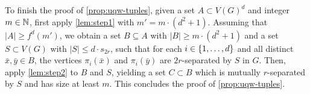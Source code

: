 \begin{comment}
\begin{proof}
We construct a sequence $C_0\subset C_1\subset \ldots$ of subsets of $B$ which are mutually $r$-independent in $G-S$, as follows.

We start with $C_0=\emptyset$. Suppose that $C_s\subset B$ is 
 already constructed for some $s\ge 0$
 and is mutually $r$-independent in $G-S$; we construct $C_{s+1}$. With each element $a\in B-C_s$,
we associate an arbitrarily chosen function $f_a\colon \set{1,\ldots,d}^2\to C_s\cup \set{\bot}$
with the following properties:
\begin{itemize}
	\item If $f_a(i,j)=b$ then the $i$th coordinate of $a$
	and the $j$th coordinate of $b$ are not $r$-separated by $S$.
	\item If $f_a(i,j)=\bot$ then there is no element $b\in C_s$ 
	such that the $i$th coordinate of $a$ and the $j$th coordinate of $b$ are at not $r$-separated by $S$.
\end{itemize}
Observe that whenever $a_1, a_2$ are two distinct elements of $B-C_s$,
then for all $i,j\in \set{1,\ldots,d}^2$, the values $f_{a_1}(i,j)$ and $f_{a_2}(i,j)$
cannot be equal to the same element $b\in C_s$:
otherwise, we would have that the $i$th coordinate of $a_1$
and the $i$th coordinate of $a_2$ are not $2r$-separated by $S$, which is impossible by the assumption on $B$.
In particular, if $|B-C_s|> |C_s|\cdot d^2$
then there must be some element  $a\in B-C_s$  
such that $f_a(i,j)=\bot$  for all $i,j\in\set{1,\ldots,d}$.
Let $C_{s+1}=C_s\cup \set a$.
By construction, $C_{s+1}$ is mutually $r$-independent in $G-S$.

We may repeat the construction as long as $|B|>|C_s|\cdot (d^2+1)=s\cdot (d^2+1)$, and we stop when this inequality no longer holds. Define the set $C$ as the last constructed set $C_s$.
By construction, $|C_s|=s\ge 
\frac{|B|}{d^2+1}$.	
\end{proof}
\end{comment}

To finish the proof of \cref{prop:uqw-tuples},
given a set $A\subset V(G)^d$ and integer $m\in\mathbb{N}$,
first apply 
\cref{lem:step1} 
  with $m'= m\cdot (d^2+1)$.
 Assuming that $|A|\ge f^d(m')$, 
we obtain a set $B\subseteq A$ with $|B|\ge m\cdot (d^2+1)$ and a set $S\subset V(G)$ with $|S|\le d\cdot s_{2r}$,
such that for each $i\in \{1,\ldots,d\}$ and all distinct $\bar{x},\bar{y}\in B$, the vertices $\pi_i(\bar{x})$ and $\pi_i(\bar{y})$ are $2r$-separated by $S$ in $G$. 
Then, apply \cref{lem:step2} to $B$ and $S$, yielding a set $C\subset B$ which is mutually $r$-separated by $S$ and has size at least $m$. 
This concludes the proof of \cref{prop:uqw-tuples}.

